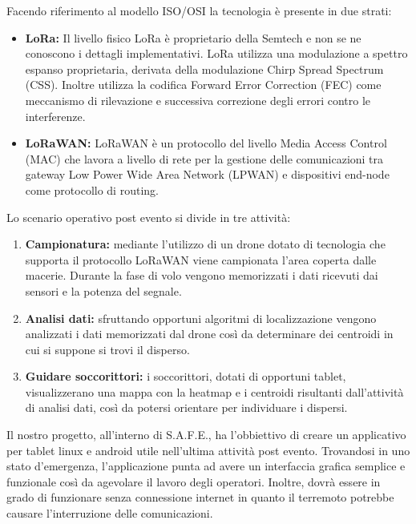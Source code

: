 \documentclass[a4paper]{article}
\begin{document}
Facendo riferimento al modello ISO/OSI la tecnologia è presente in due strati: 
\begin{itemize}
    \item \textbf{LoRa: } Il livello fisico LoRa è proprietario della Semtech e non se ne conoscono i dettagli implementativi.
    LoRa utilizza una modulazione a spettro espanso proprietaria, derivata della modulazione Chirp Spread Spectrum (CSS). Inoltre utilizza la codifica Forward Error Correction (FEC) come meccanismo di rilevazione e successiva correzione degli errori contro le interferenze. 
    \item \textbf{LoRaWAN: } LoRaWAN è un protocollo del livello Media Access Control (MAC) che lavora a livello di rete per la gestione delle comunicazioni tra gateway Low Power Wide Area Network (LPWAN) e dispositivi end-node come protocollo di routing.
    \end{itemize} 
Lo scenario operativo post evento si divide in tre attività:
\begin{enumerate}[label=\roman{*}., ref=(\roman{*})]
    \item \textbf{Campionatura:} mediante l'utilizzo di un drone dotato di tecnologia che supporta il protocollo LoRaWAN viene campionata l'area coperta dalle macerie. Durante la fase di volo vengono memorizzati i dati ricevuti dai sensori e la potenza del segnale.
    \item \textbf{Analisi dati:} sfruttando opportuni algoritmi di localizzazione vengono analizzati i dati memorizzati dal drone così da determinare dei centroidi in cui si suppone si trovi il disperso. 
    \item \textbf{Guidare soccorittori:} i soccorittori, dotati di opportuni tablet, visualizzerano una mappa con la heatmap e i centroidi risultanti dall'attività di analisi dati, così da potersi orientare per individuare i dispersi.
    \end{enumerate}

Il nostro progetto, all'interno di S.A.F.E.,  ha l'obbiettivo di creare un applicativo per tablet linux e android utile nell'ultima attività post evento.\newline 
Trovandosi in uno stato d'emergenza, l'applicazione punta ad avere un interfaccia grafica semplice e funzionale così da agevolare il lavoro degli operatori. Inoltre, dovrà essere in grado di funzionare senza connessione internet in quanto il terremoto potrebbe causare l'interruzione delle comunicazioni.

\end{document}
